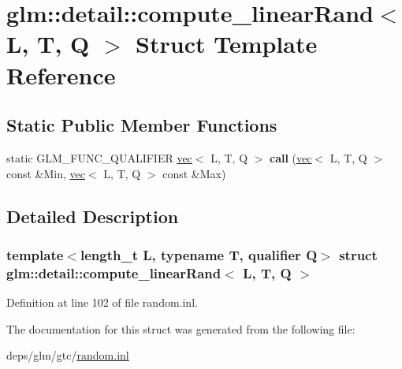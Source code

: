 \hypertarget{structglm_1_1detail_1_1compute__linearRand}{}\section{glm\+:\+:detail\+:\+:compute\+\_\+linear\+Rand$<$ L, T, Q $>$ Struct Template Reference}
\label{structglm_1_1detail_1_1compute__linearRand}
\subsection*{Static Public Member Functions}
\begin{DoxyCompactItemize}
\item 
\mbox{\label{structglm_1_1detail_1_1compute__linearRand_a96fb666d7c6fc741f77a6c119d8367d1}} 
static G\+L\+M\+\_\+\+F\+U\+N\+C\+\_\+\+Q\+U\+A\+L\+I\+F\+I\+ER \hyperlink{structglm_1_1vec}{vec}$<$ L, T, Q $>$ {\bfseries call} (\hyperlink{structglm_1_1vec}{vec}$<$ L, T, Q $>$ const \&Min, \hyperlink{structglm_1_1vec}{vec}$<$ L, T, Q $>$ const \&Max)
\end{DoxyCompactItemize}


\subsection{Detailed Description}
\subsubsection*{template$<$length\+\_\+t L, typename T, qualifier Q$>$\newline
struct glm\+::detail\+::compute\+\_\+linear\+Rand$<$ L, T, Q $>$}



Definition at line 102 of file random.\+inl.



The documentation for this struct was generated from the following file\+:\begin{DoxyCompactItemize}
\item 
deps/glm/gtc/\hyperlink{random_8inl}{random.\+inl}\end{DoxyCompactItemize}
